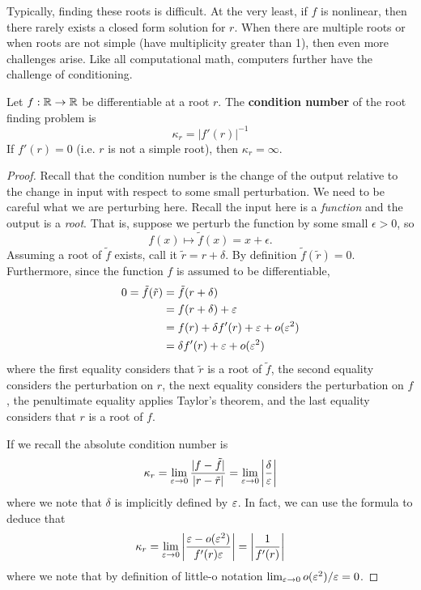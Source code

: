 \documentclass[11pt]{article}
\begin{document}
Typically, finding these roots is difficult. At the very least, if $f$ is nonlinear, then there rarely exists a closed form solution for $r$. When there are multiple roots or when roots are not simple (have multiplicity greater than 1), then even more challenges arise. Like all computational math, computers further have the challenge of conditioning.  
\begin{proposition}
    Let $f : \mathbb{R} \to \mathbb{R}$ be differentiable at a root $r$. The \textbf{condition number} of the root finding problem is $$\kappa_r = |f'(r)|^{-1}$$
    If $f'(r) = 0$ (i.e. $r$ is not a simple root), then $\kappa_r = \infty$.
\end{proposition}
\begin{proof}
    Recall that the condition number is the  change of the output relative  to the change in input with respect to some small perturbation. We need to be careful what we are perturbing here. Recall the input here is a \textit{function} and the output is a \textit{root}. That is, suppose we perturb the function by some small $\epsilon > 0$, so $$f(x) \mapsto \tilde{f}(x) = x+\epsilon.$$
    Assuming a root of $\tilde{f}$ exists, call it $\tilde{r} = r+\delta$. By definition $\tilde{f}(\tilde{r}) = 0$. Furthermore, since the function $f$ is assumed to be differentiable, \begin{align}
    0 = \tilde{f}(\tilde{r})&=\tilde{f}(r+\delta) \nonumber\\
    &=f(r+\delta) + \varepsilon \nonumber\\
    &= f(r) +\delta f'(r) + \varepsilon + o(\varepsilon^2) \nonumber\\ &= \delta f'(r) +\varepsilon+o(\varepsilon^2) \label{condition-number-derivation}\end{align}
    where the first equality considers that $\tilde{r}$ is a root of $\tilde{f}$, the second equality considers the perturbation on $r$, the next equality considers the perturbation on $f$, the penultimate equality applies Taylor's theorem, and the last equality considers that $r$ is a root of $f$.   

    If we recall the absolute condition number is $$\kappa_r = \lim_{\varepsilon \to 0}\frac{|f-\tilde{f}|}{|r-\tilde{r}|}=\lim_{\varepsilon \to 0}\left|\frac{\delta}{\varepsilon}\right|$$
    where we note that $\delta$ is implicitly defined by $\varepsilon$. In fact, we can use the formula  to deduce that $$\kappa_r = \lim_{\varepsilon \to 0}\left|\frac{\varepsilon - o(\varepsilon^2)}{f'(r)\varepsilon}\right| = \left|\frac{1}{f'(r)}\right|$$
    where we note that by definition of little-o notation $\lim_{\varepsilon \to 0} o(\varepsilon^2)/\varepsilon = 0$.
\end{proof}
\end{document}

